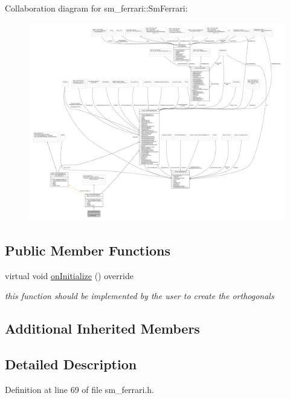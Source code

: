 Collaboration diagram for sm\+\_\+ferrari\+:\+:Sm\+Ferrari\+:
\nopagebreak
\begin{figure}[H]
\begin{center}
\leavevmode
\includegraphics[width=350pt]{structsm__ferrari_1_1SmFerrari__coll__graph}
\end{center}
\end{figure}
\subsection*{Public Member Functions}
\begin{DoxyCompactItemize}
\item 
virtual void \hyperlink{structsm__ferrari_1_1SmFerrari_a024d7b61edb9121eb68bfbcc20618636}{on\+Initialize} () override
\begin{DoxyCompactList}\small\item\em this function should be implemented by the user to create the orthogonals \end{DoxyCompactList}\end{DoxyCompactItemize}
\subsection*{Additional Inherited Members}


\subsection{Detailed Description}


Definition at line 69 of file sm\+\_\+ferrari.\+h.



